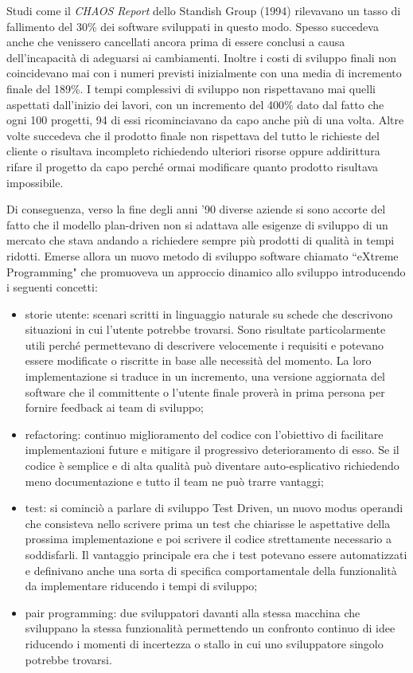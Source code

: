 \documentclass[target=bach,aauheader=,style=]{thud}
\begin{document}
Studi come il \textit{CHAOS Report} \cite{standish1994chaos} dello Standish Group (1994) rilevavano un tasso di fallimento del 30\% dei software
sviluppati in questo modo. Spesso succedeva anche che venissero cancellati ancora prima di essere conclusi a causa dell'incapacità di adeguarsi ai cambiamenti.
Inoltre i costi di sviluppo finali non coincidevano mai con i numeri previsti inizialmente con una media di incremento finale del 189\%.
I tempi complessivi di sviluppo non rispettavano mai quelli aspettati dall'inizio dei lavori, con un incremento del 400\% dato dal fatto che ogni 100 progetti, 94 di essi ricominciavano da capo
anche più di una volta. Altre volte succedeva che il prodotto finale non rispettava del tutto le richieste del cliente o risultava incompleto richiedendo ulteriori risorse oppure addirittura rifare
il progetto da capo perché ormai modificare quanto prodotto risultava impossibile.

Di conseguenza, verso la fine degli anni '90 diverse aziende si sono accorte del fatto che il modello plan-driven non si adattava alle esigenze di sviluppo di un mercato che stava andando a richiedere
sempre più prodotti di qualità in tempi ridotti. Emerse allora un nuovo metodo di sviluppo software chiamato ``eXtreme Programming" che promuoveva un approccio dinamico allo sviluppo introducendo i
seguenti concetti:
\begin{itemize}
    \item storie utente: scenari scritti in linguaggio naturale su schede che descrivono situazioni in cui l'utente potrebbe trovarsi.
    Sono risultate particolarmente utili perché permettevano di descrivere velocemente i requisiti e potevano essere modificate o riscritte in base alle necessità del momento.
    La loro implementazione si traduce in un incremento, una versione aggiornata del software che il committente o l'utente finale proverà in prima persona per fornire feedback ai team di sviluppo;
    \item refactoring: continuo miglioramento del codice con l'obiettivo di facilitare implementazioni future e mitigare il progressivo deterioramento di esso. Se il codice è semplice e di alta
    qualità può diventare auto-esplicativo richiedendo meno documentazione e tutto il team ne può trarre vantaggi;
    \item test: si cominciò a parlare di sviluppo Test Driven, un nuovo modus operandi che consisteva nello scrivere prima un test che chiarisse le aspettative
    della prossima implementazione e poi scrivere il codice strettamente necessario a soddisfarli. Il vantaggio principale era che i test potevano
    essere automatizzati e definivano anche una sorta di specifica comportamentale della funzionalità da implementare riducendo i tempi di sviluppo;
    \item pair programming: due sviluppatori davanti alla stessa macchina che sviluppano la stessa funzionalità permettendo un confronto
    continuo di idee riducendo i momenti di incertezza o stallo in cui uno sviluppatore singolo potrebbe trovarsi.
\end{itemize}
\end{document}
